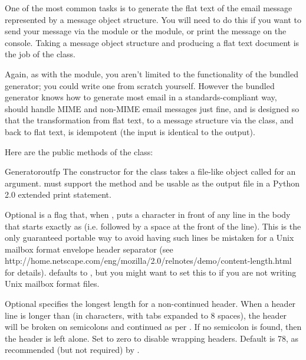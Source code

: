 
One of the most common tasks is to generate the flat text of the email
message represented by a message object structure.  You will need to do
this if you want to send your message via the 
module or the  module, or print the message on the
console.  Taking a message object structure and producing a flat text
document is the job of the  class.

Again, as with the  module, you aren't limited
to the functionality of the bundled generator; you could write one
from scratch yourself.  However the bundled generator knows how to
generate most email in a standards-compliant way, should handle MIME
and non-MIME email messages just fine, and is designed so that the
transformation from flat text, to a message structure via the
 class, and back to flat text, is idempotent (the input
is identical to the output).

Here are the public methods of the  class:

\begin{classdesc}{Generator}{outfp}
The constructor for the  class takes a file-like
object called  for an argument.   must support
the  method and be usable as the output file in a
Python 2.0 extended print statement.

Optional  is a flag that, when , puts a
\samp{>} character in front of any line in the body that starts exactly as
 (i.e.  followed by a space at the front of the
line).  This is the only guaranteed portable way to avoid having such
lines be mistaken for a Unix mailbox format envelope header separator (see
{http://home.netscape.com/eng/mozilla/2.0/relnotes/demo/content-length.html}
for details).   defaults to , but you
might want to set this to  if you are not writing Unix
mailbox format files.

Optional  specifies the longest length for a
non-continued header.  When a header line is longer than
 (in characters, with tabs expanded to 8 spaces),
the header will be broken on semicolons and continued as per
.  If no semicolon is found, then the header is left alone.
Set to zero to disable wrapping headers.  Default is 78, as
recommended (but not required) by .
\end{classdesc}

